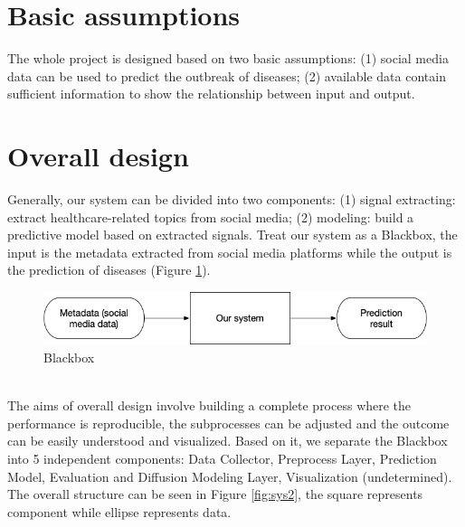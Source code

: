 \section{Basic assumptions}
The whole project is designed based on two basic assumptions: (1) social media data can be used to predict the outbreak of diseases; (2) available data contain sufficient information to show the relationship between input and output.

\section{Overall design}
\label{sec:Overall design}
Generally, our system can be divided into two components: (1) signal extracting: extract healthcare-related topics from social media; (2) modeling: build a predictive model based on extracted signals. Treat our system as a Blackbox, the input is the metadata extracted from social media platforms while the output is the prediction of diseases (Figure \ref{fig:sys1}). 
\begin{figure}[!htp]
    \center
    \includegraphics[width=5in]{images/system1.png}
    \caption{Blackbox}
    \label{fig:sys1}
\end{figure}
\\The aims of overall design involve building a complete process where the performance is reproducible, the subprocesses can be adjusted and the outcome can be easily understood and visualized. Based on it, we separate the Blackbox into 5 independent components: Data Collector, Preprocess Layer, Prediction Model, Evaluation and Diffusion Modeling Layer, Visualization (undetermined). The overall structure can be seen in Figure \ref{fig:sys2}, the square represents component while ellipse represents data.
